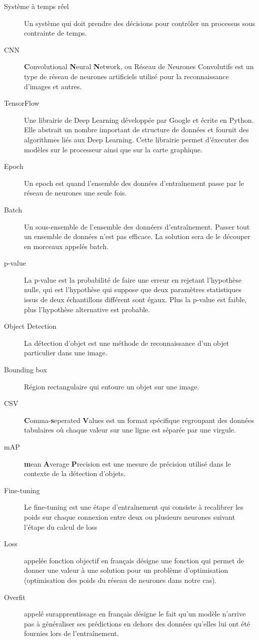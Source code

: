 \documentclass[french]{article}
\theoremstyle{mytheoremstyle}
\theoremstyle{mytheoremstyle}
\theoremstyle{myproblemstyle}
\begin{document}
\begin{description}  
\item [Système à temps réel] Un système qui doit prendre des décisions pour contrôler un processus sous contrainte de temps.
\item [CNN] \textbf{C}onvolutional \textbf{N}eural \textbf{N}etwork, ou Réseau de Neurones Convolutifs est un type de réseau de neurones artificiels utilisé pour la reconnaissance d'images et autres.
\item [TensorFlow] Une librairie de Deep Learning développée par Google et écrite en Python. Elle abstrait un nombre important de structure de données et fournit des algorithmes liés aux Deep Learning. Cette librairie permet d'éxecuter des modèles sur le processeur ainsi que sur la carte graphique.
\item [Epoch] Un epoch est quand l'ensemble des données d'entraînement passe par le réseau de neurones une seule fois.
\item [Batch] Un sous-ensemble de l'ensemble des donnéers d'entraînement. Passer tout un ensemble de données n'est pas efficace. La solution sera de le découper en morceaux appelés batch.
\item [p-value] La p-value est la probabilité de faire une erreur en rejetant l'hypothèse nulle, qui est l'hypothèse qui suppose que deux paramètres statistiques issus de deux échantillons différent sont égaux. Plus la p-value est faible, plus l'hypothèse alternative est probable.
\item [Object Detection] La détection d'objet est une méthode de reconnaissance d'un objet particulier dans une image.
\item [Bounding box] Région rectangulaire qui entoure un objet sur une image.
\item [CSV] \textbf{C}omma-\textbf{s}eperated \textbf{V}alues est un format spécifique regroupant des données tabulaires où chaque valeur sur une ligne est séparée par une virgule.
\item [mAP] \textbf{m}ean \textbf{A}verage \textbf{P}recision est une mesure de précision utilisé dans le contexte de la détection d'objets.
\item [Fine-tuning] Le fine-tuning est une étape d'entraînement qui consiste à recalibrer les poids sur chaque connexion entre deux ou plusieurs neurones suivant l'étape du calcul de loss
\item [Loss] appelée fonction objectif en français désigne une fonction qui permet de donner une valeur à une solution pour un problème d'optimisation (optimisation des poids du réseau de neurones dans notre cas).
\item [Overfit] appelé surapprentissage en français désigne le fait qu'un modèle n'arrive pas à généraliser ses prédictions en dehors des données qu'elles lui ont été fournies lors de l'entraînement.
\end{description}
\end{document}
